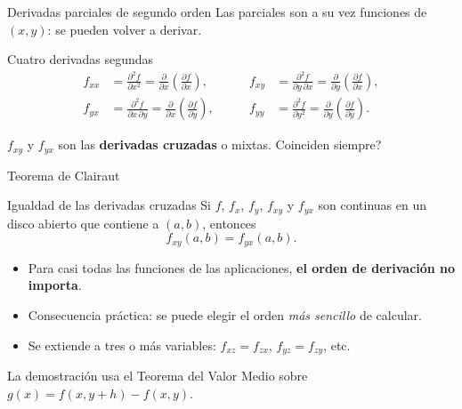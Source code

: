 \documentclass[11pt,aspectratio=169]{beamer}
\begin{document}
\begin{frame}{Derivadas parciales de segundo orden}
  Las parciales son a su vez funciones de $(x,y)$: se pueden volver a derivar.
  \pause
  \begin{block}{Cuatro derivadas segundas}
    \[
    \begin{aligned}
      f_{xx} &= \frac{\partial^2f}{\partial x^2}=\frac{\partial}{\partial x}\!\left(\frac{\partial f}{\partial x}\right),
      &\qquad
      f_{xy} &= \frac{\partial^2f}{\partial y\,\partial x}=\frac{\partial}{\partial y}\!\left(\frac{\partial f}{\partial x}\right),\\[4pt]
      f_{yx} &= \frac{\partial^2f}{\partial x\,\partial y}=\frac{\partial}{\partial x}\!\left(\frac{\partial f}{\partial y}\right),
      &\qquad
      f_{yy} &= \frac{\partial^2f}{\partial y^2}=\frac{\partial}{\partial y}\!\left(\frac{\partial f}{\partial y}\right).
    \end{aligned}
    \]
  \end{block}
  \pause
  \begin{center}
  \small\color{gray60} $f_{xy}$ y $f_{yx}$ son las \textbf{derivadas cruzadas} o mixtas. \textquestiondown{}Coinciden siempre?
  \end{center}
\end{frame}

\begin{frame}{Teorema de Clairaut}
  \begin{block}{Igualdad de las derivadas cruzadas}
    Si $f$, $f_x$, $f_y$, $f_{xy}$ y $f_{yx}$ son continuas en un disco abierto que contiene a $(a,b)$, entonces
    \[
      f_{xy}(a,b)=f_{yx}(a,b).
    \]
  \end{block}
  \pause
  \vspace{4pt}
  \begin{itemize}
    \item Para casi todas las funciones de las aplicaciones, \textbf{el orden de derivación no importa}.
    \pause
    \item Consecuencia práctica: se puede elegir el orden \emph{más sencillo} de calcular.
    \pause
    \item Se extiende a tres o más variables: $f_{xz}=f_{zx}$, $f_{yz}=f_{zy}$, etc.
  \end{itemize}
  \vspace{6pt}
  \pause
  \begin{center}\small\color{gray60} La demostración usa el Teorema del Valor Medio sobre $g(x)=f(x,y+h)-f(x,y)$.\end{center}
\end{frame}
\end{document}
